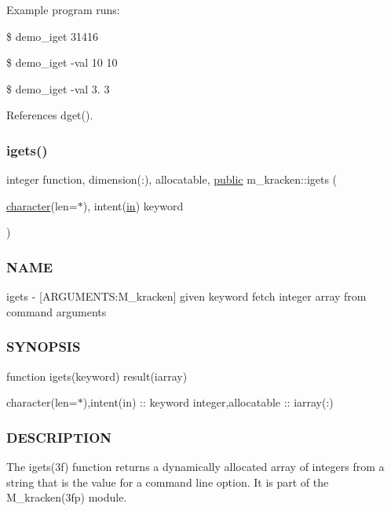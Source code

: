 Example program runs\+:

\$ demo\+\_\+iget 31416

\$ demo\+\_\+iget -\/val 10 10

\$ demo\+\_\+iget -\/val 3. 3 

References dget().

\mbox{\label{namespacem__kracken_ac118bb44d855d68bfce6caa80d60e5e0}} 
\subsubsection{\texorpdfstring{igets()}{igets()}}
{\footnotesize\ttfamily integer function, dimension(\+:), allocatable, \hyperlink{M__stopwatch_83_8txt_a2f74811300c361e53b430611a7d1769f}{public} m\+\_\+kracken\+::igets (\begin{DoxyParamCaption}\item[{\hyperlink{option__stopwatch_83_8txt_abd4b21fbbd175834027b5224bfe97e66}{character}(len=$\ast$), intent(\hyperlink{M__journal_83_8txt_afce72651d1eed785a2132bee863b2f38}{in})}]{keyword }\end{DoxyParamCaption})}



\subsubsection*{N\+A\+ME}

igets -\/ \mbox{[}A\+R\+G\+U\+M\+E\+N\+TS\+:M\+\_\+kracken\mbox{]} given keyword fetch integer array from command arguments \subsubsection*{S\+Y\+N\+O\+P\+S\+IS}

function igets(keyword) result(iarray)

character(len=$\ast$),intent(in) \+:\+: keyword integer,allocatable \+:\+: iarray(\+:) \subsubsection*{D\+E\+S\+C\+R\+I\+P\+T\+I\+ON}

The igets(3f) function returns a dynamically allocated array of integers from a string that is the value for a command line option. It is part of the M\+\_\+kracken(3fp) module.

